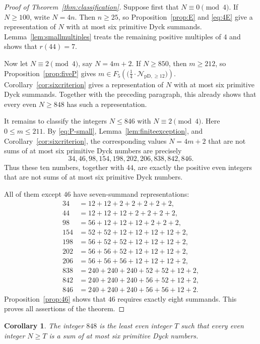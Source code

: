 \documentclass[12pt]{article}
\theoremstyle{plain}
\newtheorem{corollary}[theorem]{Corollary}
\theoremstyle{definition}
\theoremstyle{plain}
\newcommand{\Pset}{%
  \bigl(\tfrac{1}{4}\cdot\mathcal{N}_{\mathrm{pD},\geq 12}\bigr)%
}
\begin{document}
\begin{proof}[Proof of Theorem~\ref{thm:classification}]
Suppose first that $N\equiv0\pmod4$.  If $N\geq100$, write $N=4n$.
Then $n\geq25$, so Proposition~\ref{prop:E} and \eqref{eq:4E} give a
representation of $N$ with at most six primitive Dyck summands.
Lemma~\ref{lem:smallmultiples} treats the remaining positive multiples
of $4$ and shows that $r(44)=7$.

Now let $N\equiv2\pmod4$, say $N=4m+2$.  If $N\geq850$, then
$m\geq212$, so Proposition~\ref{prop:fiveP} gives
$m\in F_5(\Pset)$.  Corollary~\ref{cor:sixcriterion} gives a
representation of $N$ with at most six primitive Dyck summands.  Together
with the preceding paragraph, this already shows that every even
$N\geq848$ has such a representation.

It remains to classify the integers $N\leq846$ with
$N\equiv2\pmod4$.  Here $0\leq m\leq211$.  By
\eqref{eq:P-small}, Lemma~\ref{lem:finiteexception}, and
Corollary~\ref{cor:sixcriterion}, the corresponding values $N=4m+2$
that are not sums of at most six primitive Dyck numbers are precisely
\[
 34,46,98,154,198,202,206,838,842,846.
\]
Thus these ten numbers, together with $44$, are exactly the positive even
integers that are not sums of at most six primitive Dyck numbers.

All of them except $46$ have seven-summand representations:
\[
\begin{aligned}
34&=12+12+2+2+2+2+2,\\
44&=12+12+12+2+2+2+2,\\
98&=56+12+12+12+2+2+2,\\
154&=52+52+12+12+12+12+2,\\
198&=56+52+52+12+12+12+2,\\
202&=56+56+52+12+12+12+2,\\
206&=56+56+56+12+12+12+2,\\
838&=240+240+240+52+52+12+2,\\
842&=240+240+240+56+52+12+2,\\
846&=240+240+240+56+56+12+2.
\end{aligned}
\]
Proposition~\ref{prop:46} shows that $46$ requires exactly eight
summands.  This proves all assertions of the theorem.
\end{proof}

\begin{corollary}\label{cor:threshold}
The integer $848$ is the least even integer $T$ such that every even
integer $N\geq T$ is a sum of at most six primitive Dyck numbers.
\end{corollary}
\end{document}
